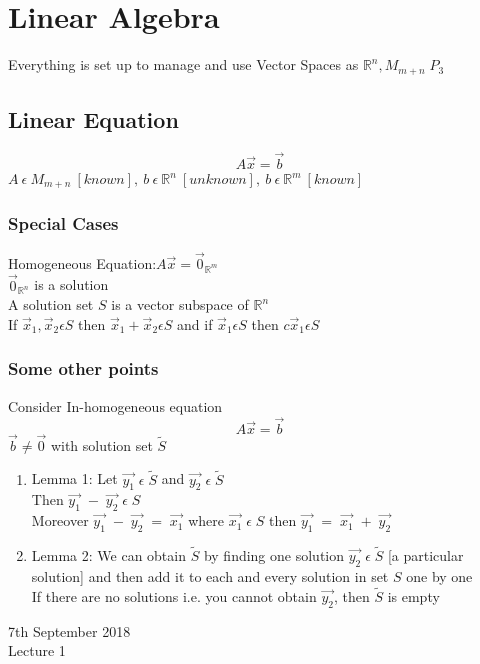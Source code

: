 \documentclass[11pt]{article}
\theoremstyle{definition}
\newcommand{\R}{\mathbb{R}}
\begin{document}
\section{Linear Algebra}
Everything is set up to manage and use Vector Spaces as $\R^n, M_{m+n} \; P_3$
\subsection{Linear Equation}
$$A\vec{x} = \vec{b}$$
$A\:  \epsilon\:  M_{m+n}\: [known],\: b\: \epsilon\: \R^n\:  [unknown],\: b\: \epsilon\:  \R^m\:  [known]$
\subsubsection{Special Cases}
Homogeneous Equation:$A\vec{x} = \vec{0}_{\R^m}$\\
$\vec{0}_{\R^n}$ is a solution\\
A solution set \textbf{$S$} is a vector subspace of $\R^n$\\
If $\vec{x}_1, \vec{x}_2 \epsilon S$ then $\vec{x}_1 + \vec{x}_2 \epsilon S$ and if $\vec{x}_1 \epsilon S $ then $ c\vec{x}_1 \epsilon S$
\subsubsection{Some other points}
Consider In-homogeneous equation $$A\vec{x} = \vec{b}$$
$\vec{b} \neq \vec{0}$ with  solution set $\tilde{S}$
\begin{enumerate}
    \item Lemma 1: Let $\vec{y_1}\; \epsilon\; \tilde{S}$ and $\vec{y_2}\; \epsilon\; \tilde{S}$\\
    Then $\vec{y_1}\; -\; \vec{y_2}\; \epsilon\; S$\\
    Moreover $\vec{y_1}\; -\; \vec{y_2}\; =\; \vec{x_1}$ where $\vec{x_1}\; \epsilon\; S$ then $\vec{y_1}\; =\; \vec{x_1}\; +\; \vec{y_2}$
    \item Lemma 2: We can obtain $\tilde{S}$ by finding one solution $\vec{y_2}\; \epsilon\; \tilde{S}$ [a particular solution] and then add it to each and every solution in set $S$ one by one\\
    If there are no solutions i.e. you cannot obtain $\vec{y_2}$, then $\tilde{S}$ is empty
\end{enumerate}
\newpage
\begin{center}
    {\LARGE 7th September 2018 \\ Lecture 1}
\end{center}
\setcounter{section}{0}
\end{document}
